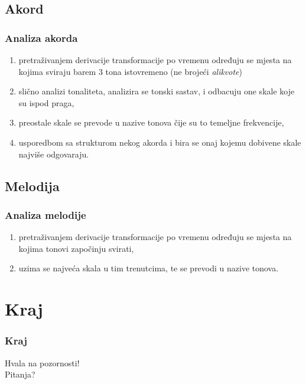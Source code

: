 \documentclass[11pt]{beamer}
\begin{document}
  \subsection{Akord}
  \begin{frame}
    \frametitle{Analiza akorda}
    \begin{enumerate}
      \item pretraživanjem derivacije transformacije po vremenu određuju se mjesta na kojima sviraju barem 3 tona istovremeno (ne brojeći \textit{alikvote})
      \item slično analizi tonaliteta, analizira se tonski sastav, i odbacuju one skale koje su ispod praga,
      \item preostale skale se prevode u nazive tonova čije su to temeljne frekvencije,
      \item usporedbom sa strukturom nekog akorda i bira se onaj kojemu dobivene skale najviše odgovaraju.
    \end{enumerate}
  \end{frame}


  \subsection{Melodija}
  \begin{frame}
    \frametitle{Analiza melodije}
    \begin{enumerate}
      \item pretraživanjem derivacije transformacije po vremenu određuju se mjesta na kojima tonovi započinju svirati,
      \item uzima se najveća skala u tim trenutcima, te se prevodi u nazive tonova.
    \end{enumerate}
  \end{frame}
  
  \section*{Kraj}
  \begin{frame}
    \frametitle{Kraj}
    Hvala na pozornosti!\\
    \vspace{10pt}
    Pitanja?
  \end{frame}
\end{document}
